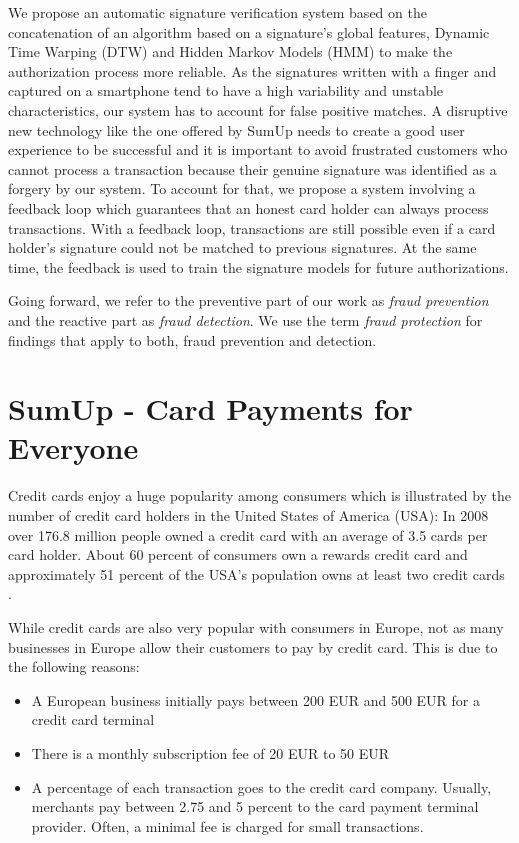 \documentclass[a4paper, oneside]{csthesis}
\begin{document}
We propose an automatic signature verification system based on the concatenation of an algorithm based on a signature's global features, Dynamic Time Warping (DTW) and Hidden Markov Models (HMM) to make the authorization process more reliable. As the signatures written with a finger and captured on a smartphone tend to have a high variability and unstable characteristics, our system has to account for false positive matches. A disruptive new technology like the one offered by SumUp needs to create a good user experience to be successful and it is important to avoid frustrated customers who cannot process a transaction because their genuine signature was identified as a forgery by our system. To account for that, we propose a system involving a feedback loop which guarantees that an honest card holder can always process transactions. With a feedback loop, transactions are still possible even if a card holder's signature could not be matched to previous signatures. At the same time, the feedback is used to train the signature models for future authorizations.

Going forward, we refer to the preventive part of our work as \emph{fraud prevention} and the reactive part as \emph{fraud detection}. We use the term \emph{fraud protection} for findings that apply to both, fraud prevention and detection.



\section{SumUp - Card Payments for Everyone}
\label{intro-sumup}

Credit cards enjoy a huge popularity among consumers which is illustrated by the number of credit card holders in the United States of America (USA): In 2008 over 176.8 million people owned a credit card with an average of 3.5 cards per card holder. About 60 percent of consumers own a rewards credit card and approximately 51 percent of the USA's population owns at least two credit cards \cite{woolsey2010credit}.

While credit cards are also very popular with consumers in Europe, not as many businesses in Europe allow their customers to pay by credit card. This is due to the following reasons:
\begin{itemize}
\item A European business initially pays between 200 EUR and 500 EUR for a credit card terminal
\item There is a monthly subscription fee of 20 EUR to 50 EUR
\item A percentage of each transaction goes to the credit card company. Usually, merchants pay between 2.75 and 5 percent to the card payment terminal provider. Often, a minimal fee is charged for small transactions.
\end{itemize}
\end{document}
